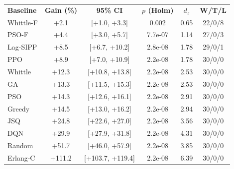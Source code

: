 \begin{tabular}{|l|c|c|c|c|c|}
\hline
\textbf{Baseline} & \textbf{Gain (\%)} & \textbf{95\% CI} & \textbf{$p$ (Holm)} & \textbf{$d_z$} & \textbf{W/T/L} \\ \thickhline
Whittle-F & +2.1 & [+1.0, +3.3] & 0.002 & 0.65 & 22/0/8 \\ \hline
PSO-F & +4.4 & [+3.0, +5.7] & 7.7e-07 & 1.14 & 27/0/3 \\ \hline
Lag-SIPP & +8.5 & [+6.7, +10.2] & 2.8e-08 & 1.78 & 29/0/1 \\ \hline
PPO & +8.9 & [+7.0, +10.9] & 2.2e-08 & 1.78 & 30/0/0 \\ \hline
Whittle & +12.3 & [+10.8, +13.8] & 2.2e-08 & 2.53 & 30/0/0 \\ \hline
GA & +13.3 & [+11.5, +15.3] & 2.2e-08 & 2.53 & 30/0/0 \\ \hline
PSO & +14.3 & [+12.6, +16.1] & 2.2e-08 & 2.91 & 30/0/0 \\ \hline
Greedy & +14.5 & [+13.0, +16.2] & 2.2e-08 & 2.94 & 30/0/0 \\ \hline
JSQ & +24.8 & [+22.6, +27.0] & 2.2e-08 & 3.56 & 30/0/0 \\ \hline
DQN & +29.9 & [+27.9, +31.8] & 2.2e-08 & 4.31 & 30/0/0 \\ \hline
Random & +51.7 & [+46.0, +57.9] & 2.2e-08 & 3.85 & 30/0/0 \\ \hline
Erlang-C & +111.2 & [+103.7, +119.4] & 2.2e-08 & 6.39 & 30/0/0 \\ \hline
\end{tabular}